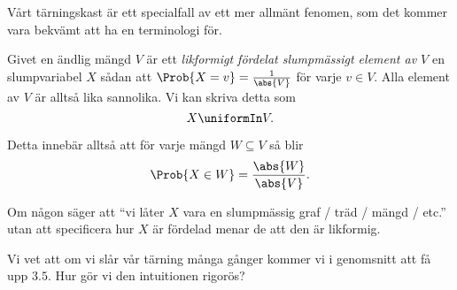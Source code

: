 \documentclass[nobib]{tufte-handout}
\begin{document}
Vårt tärningskast är ett specialfall av ett mer allmänt fenomen, som det kommer vara bekvämt att ha en terminologi för.

\begin{definition}
    Givet en ändlig mängd $V$ är ett \emph{likformigt fördelat slumpmässigt element av $V$} en slumpvariabel $X$ sådan att $\Prob{X = v} = \frac{1}{\abs{V}}$ för varje $v\in V$. Alla element av $V$ är alltså lika sannolika. Vi kan skriva detta som
    $$X \uniformIn V.$$

    Detta innebär alltså att för varje mängd $W \subseteq V$ så blir
    $$\Prob{X \in W} = \frac{\abs{W}}{\abs{V}}.$$

    Om någon säger att ``vi låter $X$ vara en slumpmässig graf / träd / mängd / etc.'' utan att specificera hur $X$ är fördelad menar de att den är likformig.
\end{definition}

Vi vet att om vi slår vår tärning många gånger kommer vi i genomsnitt att få upp $3.5$. Hur gör vi den intuitionen rigorös?
\end{document}
